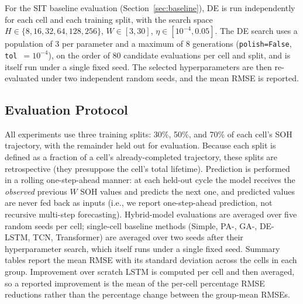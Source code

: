 For the SIT baseline evaluation (Section~\ref{sec:baseline}), DE is run
independently for each cell and each training split, with the search space
$H \in \{8, 16, 32, 64, 128, 256\}$, $W \in [3, 30]$, $\eta \in [10^{-4}, 0.05]$.
The DE search uses a population of 3 per parameter and a maximum of
8 generations (\texttt{polish=False}, \texttt{tol}~$=10^{-4}$), on the order of
80 candidate evaluations per cell and split, and is itself run under a single
fixed seed.
The selected hyperparameters are then re-evaluated under two independent random
seeds, and the mean RMSE is reported.

\subsection{Evaluation Protocol}\label{sec:eval}

All experiments use three training splits: 30\%, 50\%, and 70\% of each
cell's SOH trajectory, with the remainder held out for evaluation.
Because each split is defined as a fraction of a cell's already-completed
trajectory, these splits are retrospective (they presuppose the cell's total
lifetime). Prediction is performed in a rolling one-step-ahead manner: at each
held-out cycle the model receives the \emph{observed} previous $W$ SOH values and
predicts the next one, and predicted values are never fed back as inputs (i.e.,
we report one-step-ahead prediction, not recursive multi-step forecasting).
Hybrid-model evaluations are averaged over five random seeds per cell;
single-cell baseline methods (Simple, PA-, GA-, DE-LSTM, TCN, Transformer)
are averaged over two seeds after their hyperparameter search, which itself
runs under a single fixed seed.
Summary tables report the mean RMSE with its
standard deviation across the cells in each group.
Improvement over scratch LSTM is computed per cell and then averaged, so a
reported improvement is the mean of the per-cell percentage RMSE reductions rather
than the percentage change between the group-mean RMSEs.

